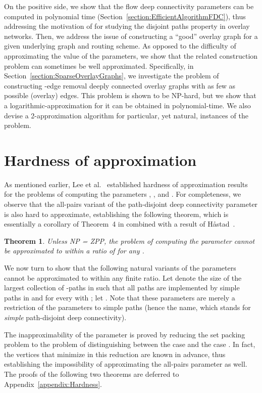 \LongVersion \documentclass[11pt]{article}
\newtheorem{theorem}{Theorem}[section]
\theoremstyle{definition}
\theoremstyle{plain}
\begin{document}
On the positive side, we show that the flow deep connectivity parameters can
be computed in polynomial time (Section~\ref{section:EfficientAlgorithmFDC}),
thus addressing the motivation of \cite{prev} for studying the disjoint paths
property in overlay networks.
Then, we address the issue of constructing a ``good'' overlay graph for a
given underlying graph and routing scheme.
As opposed to the difficulty of approximating the value of the parameters, we
show that the related construction problem can sometimes be well
approximated.
Specifically, in Section~\ref{section:SparseOverlayGraphs}, we investigate the
problem of constructing -edge removal deeply connected overlay graphs with
as few as possible (overlay) edges.
This problem is shown to be NP-hard, but we show that a
logarithmic-approximation for it can be obtained in polynomial-time.
We also devise a 2-approximation algorithm for particular, yet natural,
instances of the problem.

\section{Hardness of approximation}
\label{section:HardnessApproximation}


As mentioned earlier, Lee et al.~\cite{prev} established hardness of
approximation results for the problems of computing the parameters , , and .
For completeness, we observe that the all-pairs variant 
of the path-disjoint deep connectivity parameter is also hard to approximate,
establishing the following theorem, which is essentially a corollary of
Theorem~4 in \cite{prev} combined with a result of H{\aa}stad~\cite{Hast99}.

\begin{theorem} \label{theorem:HardnessAllPairsPDDC}
Unless NP = ZPP, the problem of computing the parameter 
cannot be approximated to within a ratio of 
for any .
\end{theorem}

We now turn to show that the following natural variants of the 
parameters cannot be approximated to within any finite ratio.
Let  denote the size of the largest collection 
of -paths in  such that all paths  are implemented by
simple paths  in  and 
for every  with ;
let .
Note that these parameters are merely a restriction of the  parameters
to simple paths (hence the name, which stands for \emph{simple} path-disjoint
deep connectivity).

The inapproximability of the  parameter is proved
by reducing the set packing problem to the problem of distinguishing between
the case  and the case .
In fact, the vertices  that minimize  in this reduction are known in advance, thus establishing the
impossibility of approximating the all-pairs parameter 
as well.
The proofs of the following two theorems are deferred to
Appendix~\ref{appendix:Hardness}.
\end{document}
